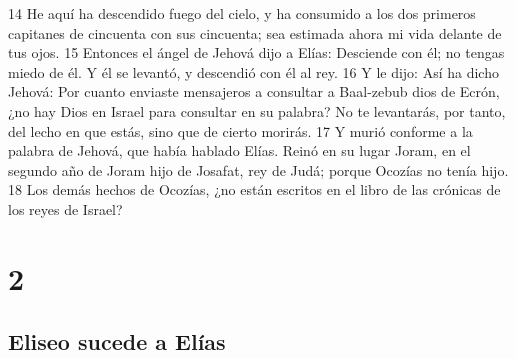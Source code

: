 14 He aquí ha descendido fuego del cielo, y ha consumido a los dos primeros capitanes de cincuenta con sus cincuenta; sea estimada ahora mi vida delante de tus ojos.
15 Entonces el ángel de Jehová dijo a Elías: Desciende con él; no tengas miedo de él. Y él se levantó, y descendió con él al rey.
16 Y le dijo: Así ha dicho Jehová: Por cuanto enviaste mensajeros a consultar a Baal-zebub dios de Ecrón, ¿no hay Dios en Israel para consultar en su palabra? No te levantarás, por tanto, del lecho en que estás, sino que de cierto morirás.
17 Y murió conforme a la palabra de Jehová, que había hablado Elías. Reinó en su lugar Joram, en el segundo año de Joram hijo de Josafat, rey de Judá; porque Ocozías no tenía hijo.
18 Los demás hechos de Ocozías, ¿no están escritos en el libro de las crónicas de los reyes de Israel?

\chapter{2}

\section*{Eliseo sucede a Elías}

